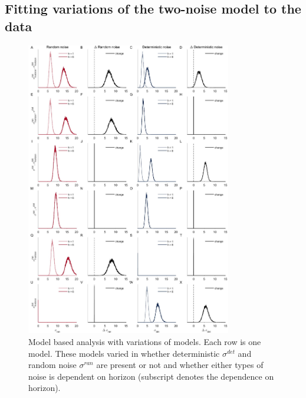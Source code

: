 \documentclass[12pt]{article}
\begin{document}
	\subsection{Fitting variations of the two-noise model to the data}
	\begin{figure}[hp]
		\begin{center}
			\includegraphics[width=0.8\textwidth]{figures/RDBayes_2noise_hyperpriors_6model.jpg}
			\caption{Model based analysis with variations of models. Each row is one model.  These models varied in whether deterministic $\sigma^{det}$ and random noise $\sigma^{ran}$ are present or not and whether either types of noise is dependent on horizon (subscript denotes the dependence on horizon). }
			\label{fig:s9}
		\end{center}
	\end{figure}


	\newpage
\end{document}
